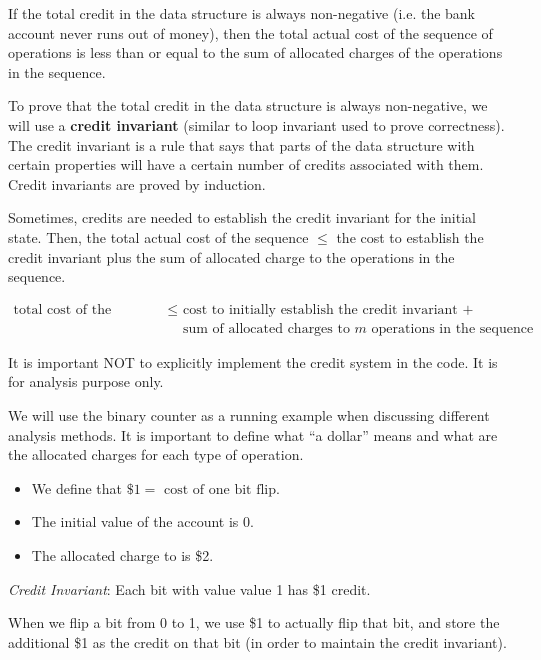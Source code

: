 If the total credit in the data structure is always non-negative (i.e. the bank account never runs out of money), then the total actual cost of the sequence of operations is less than or equal to the sum of allocated charges of the operations in the sequence.

To prove that the total credit in the data structure is always non-negative, we will use a \textbf{credit invariant} (similar to loop invariant used to prove correctness). The credit invariant is a rule that says that parts of the data structure with certain properties will have a certain number of credits associated with them. Credit invariants are proved by induction.

Sometimes, credits are needed to establish the credit invariant for the initial state. Then, the total actual cost of the sequence $\leq$ the cost to establish the credit invariant plus the sum of allocated charge to the operations in the sequence.

$$
\begin{aligned}
    \text{total cost of the sequence} \leq & \text{ cost to initially establish the credit invariant } + \\
    & \text{ sum of allocated charges to $m$ operations in the sequence}
\end{aligned}
$$

\begin{remark}
    It is important NOT to explicitly implement the credit system in the code. It is for analysis purpose only.
\end{remark}

We will use the binary counter as a running example when discussing different analysis methods. It is important to define what ``a dollar'' means and what are the allocated charges for each type of operation.

\begin{itemize}
    \item We define that $\$1 = \text{ cost of one bit flip}$.
    \item The initial value of the account is 0. 
    \item The allocated charge to  is \$2.
\end{itemize}

\textit{Credit Invariant}: Each bit with value value 1 has \$1 credit.

When we flip a bit from 0 to 1, we use \$1 to actually flip that bit, and store the additional \$1 as the credit on that bit (in order to maintain the credit invariant).

